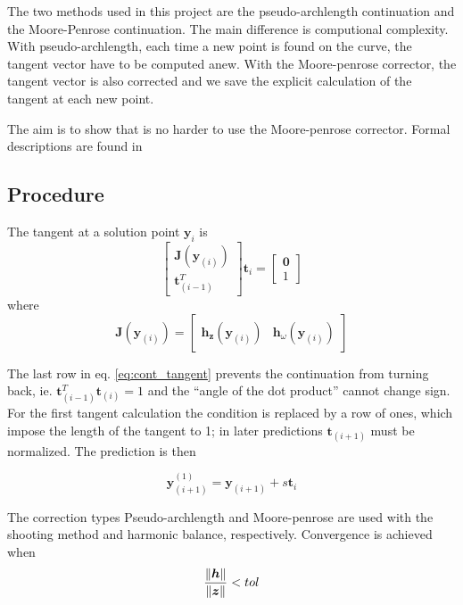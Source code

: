 The two methods used in this project are the pseudo-archlength continuation and
the Moore-Penrose continuation. The main difference is computional complexity.
With pseudo-archlength, each time a new point is found on the curve, the tangent
vector have to be computed anew. With the Moore-penrose corrector, the tangent
vector is also corrected and we save the explicit calculation of the tangent at
each new point.

The aim is to show that is no harder to use the Moore-penrose corrector. Formal
descriptions are found in \autocite{dhooge2003a}

\subsection{Procedure}
\label{sec:cont_procedure}

The tangent at a solution point $\bm y_{i}$ is
\begin{equation}
  \label{eq:cont_tangent}
  \begin{bmatrix}
    \bm J(\bm y_{(i)}) \\ \bm t^T_{(i-1)}
  \end{bmatrix}
  \bm t_{i}
  =
  \begin{bmatrix}
    \bm 0 \\ 1
  \end{bmatrix}
\end{equation}
where
\begin{equation}
  \label{eq:cont_J}
  \bm J(\bm y_{(i)}) =
  \begin{bmatrix}
    \bm h_{\bm z}(\bm y_{(i)}) & \bm h_{\omega}(\bm y_{(i)})
  \end{bmatrix}
\end{equation}

The last row in eq. \eqref{eq:cont_tangent} prevents the continuation from
turning back, ie. $\bm t^T_{(i-1)} \bm t_{(i)}=1$ and the ``angle of the dot
product'' cannot change sign. For the first tangent calculation the condition is
replaced by a row of ones, which impose the length of the tangent to 1; in later
predictions $\bm t_{(i+1)}$ must be normalized. The prediction is then

\begin{equation}
  \label{eq:cont_pred}
  \bm y^{(1)}_{(i+1)} = \bm y_{(i+1)} + s \bm t_i
\end{equation}

The correction types Pseudo-archlength and Moore-penrose are used with the
shooting method and harmonic balance, respectively. Convergence is achieved when
\begin{equation}
  \label{eq:cont_convergence}
  \frac{\left\lVert \bm h \right\rVert}{\left\lVert \bm z \right\rVert} < tol
\end{equation}

